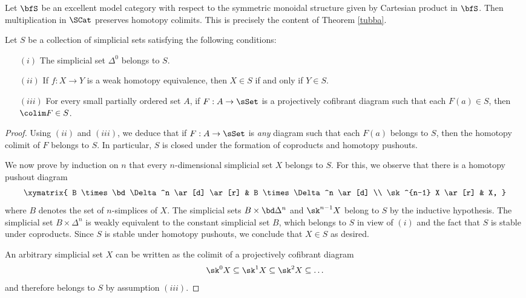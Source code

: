 \begin{Simplicial Categories}
\begin{example}\label{canuss}
Let $\bfS$ be an excellent model category with respect to the symmetric monoidal structure
given by Cartesian product in $\bfS$. Then multiplication in $\SCat$ preserves homotopy colimits.
This is precisely the content of Theorem \ref{tubba}.
\end{example}

\begin{lemma}\label{alem}
Let $S$ be a collection of simplicial sets satisfying the following conditions:
\begin{itemize}
\item[$(i)$] The simplicial set $\Delta^0$ belongs to $S$.
\item[$(ii)$] If $f: X \rightarrow Y$ is a weak homotopy equivalence, then
$X \in S$ if and only if $Y \in S$.
\item[$(iii)$] For every small partially ordered set $A$, if
$F: A \rightarrow \sSet$ is a projectively cofibrant diagram such that
each $F(a) \in S$, then $\colim F \in S$.
\end{itemize}
\end{lemma}

\begin{proof}
Using $(ii)$ and $(iii)$, we deduce that if $F: A \rightarrow \sSet$ is
{\em any} diagram such that each $F(a)$ belongs to $S$, then
the homotopy colimit of $F$ belongs to $S$. In particular, $S$ is closed under the formation of coproducts and homotopy pushouts.

We now prove by induction on $n$ that every $n$-dimensional simplicial set $X$ belongs to $S$.
For this, we observe that there is a homotopy pushout diagram
$$ \xymatrix{ B \times \bd \Delta^n \ar[d] \ar[r] & B \times \Delta^n \ar[d] \\
\sk^{n-1} X \ar[r] & X, }$$
where $B$ denotes the set of $n$-simplices of $X$. The simplicial sets
$B \times \bd \Delta^n$ and $\sk^{n-1} X$ belong to $S$ by the inductive hypothesis.
The simplicial set $B \times \Delta^n$ is weakly equivalent to the constant simplicial
set $B$, which belongs to $S$ in view of $(i)$ and the fact that $S$ is stable under coproducts.
Since $S$ is stable under homotopy pushouts, we conclude that $X \in S$ as desired.

An arbitrary simplicial set $X$ can be written as the colimit of a projectively cofibrant diagram
$$ \sk^{0} X \subseteq \sk^{1} X \subseteq \sk^{2} X \subseteq \ldots$$
and therefore belongs to $S$ by assumption $(iii)$.
\end{proof}


\end{Simplicial Categories}
